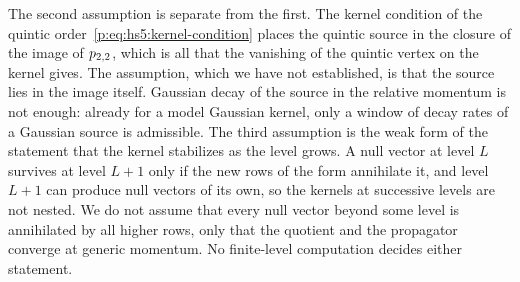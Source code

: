 The second assumption is separate from the first.
  The kernel condition of the quintic order~\eqref{p:eq:hs5:kernel-condition} places the quintic source in the closure of the image of $p_{2,2}$, which is all that the vanishing of the quintic vertex on the kernel gives.
  The assumption, which we have not established, is that the source lies in the image itself.
  Gaussian decay of the source in the relative momentum is not enough: already for a model Gaussian kernel, only a window of decay rates of a Gaussian source is admissible.
  The third assumption is the weak form of the statement that the kernel stabilizes as the level grows.
  A null vector at level $L$ survives at level $L + 1$ only if the new rows of the form annihilate it, and level $L + 1$ can produce null vectors of its own, so the kernels at successive levels are not nested.
  We do not assume that every null vector beyond some level is annihilated by all higher rows, only that the quotient and the propagator converge at generic momentum.
  No finite-level computation decides either statement.
